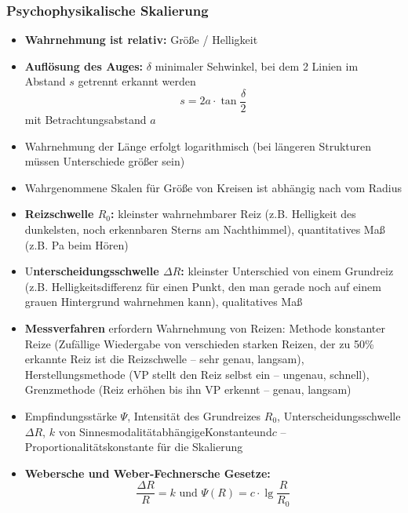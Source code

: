 \documentclass[12pt,landscape]{article}
\begin{document}
\begin{multicols}{3}
\subsubsection{Psychophysikalische Skalierung}
\begin{itemize}
\item \textbf{Wahrnehmung ist relativ:} Größe / Helligkeit 
\item \textbf{Auflösung des Auges:} $\delta$ minimaler Sehwinkel, bei dem 2 Linien im Abstand $s$ getrennt erkannt werden\[s = 2a \cdot \tan{\frac{\delta}{2}}\] mit Betrachtungsabstand $a$
\item Wahrnehmung der Länge erfolgt logarithmisch (bei längeren Strukturen müssen Unterschiede größer sein)
\item Wahrgenommene Skalen für Größe von Kreisen ist abhängig nach vom Radius
\item \textbf{Reizschwelle $R_0$:} kleinster wahrnehmbarer Reiz (z.B. Helligkeit des dunkelsten, noch erkennbaren Sterns am Nachthimmel), quantitatives Maß (z.B. Pa beim Hören) 
\item U\textbf{nterscheidungsschwelle $\Delta R$:} kleinster Unterschied von einem Grundreiz (z.B. Helligkeitsdifferenz für einen Punkt, den man gerade noch auf einem grauen Hintergrund wahrnehmen kann), qualitatives Maß 
\item \textbf{Messverfahren} erfordern Wahrnehmung von Reizen: Methode konstanter Reize (Zufällige Wiedergabe von verschieden starken Reizen, der zu 50\% erkannte Reiz ist die Reizschwelle -- sehr genau, langsam), Herstellungsmethode (VP stellt den Reiz selbst ein -- ungenau, schnell), Grenzmethode (Reiz erhöhen bis ihn VP erkennt -- genau, langsam)
\item Empfindungsstärke $\Psi$, Intensität des Grundreizes $R_0$, Unterscheidungsschwelle $\Delta R$, $k$ von Sinnesmodalität\hfill abhängige\hfill Konstante\hfill und\newline $c$ -- Proportionalitätskonstante für die Skalierung
\item \textbf{Webersche und Weber-Fechnersche Gesetze:}\\
\[\frac{\Delta R}{R} = k \text{ und }\Psi(R) = c \cdot \lg{\frac{R}{R_0}}\]


\end{itemize}
\end{multicols}
\end{document}

